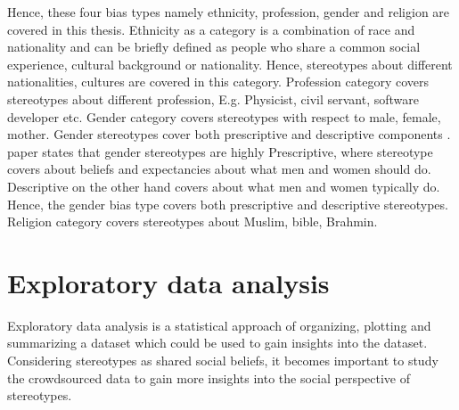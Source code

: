 \begin{table}[h!]
\centering
{}
\caption{Data statistics after pre-processing }
\label{tab:Bias_type_stats_preprocessing}
\end{table}

Hence, these four bias types namely ethnicity, profession, gender and religion are covered in this thesis. Ethnicity as a category is a combination of race and nationality and can be briefly defined as people who share a common social experience, cultural background or nationality\cite{peoples2014humanity}. Hence, stereotypes about different nationalities, cultures are covered in this category. Profession category covers stereotypes about different profession, E.g.  Physicist, civil servant, software developer etc. Gender category covers stereotypes with respect to male, female, mother. Gender stereotypes cover both prescriptive and descriptive components \cite{koenig2018comparing}. \cite{prentice2002women} paper states that gender stereotypes are highly Prescriptive, where stereotype covers about beliefs and expectancies about what men and women should do. Descriptive on the other hand covers about what men and women typically do. Hence, the gender bias type covers both prescriptive and descriptive stereotypes. Religion category covers stereotypes about Muslim, bible, Brahmin.

\section{Exploratory data analysis}\label{EDA}

Exploratory data analysis is a statistical approach of organizing, plotting and summarizing a dataset which could be used to gain insights into the dataset. Considering stereotypes as shared social beliefs, it becomes important to study the crowdsourced data to gain more insights into the social perspective of stereotypes.
